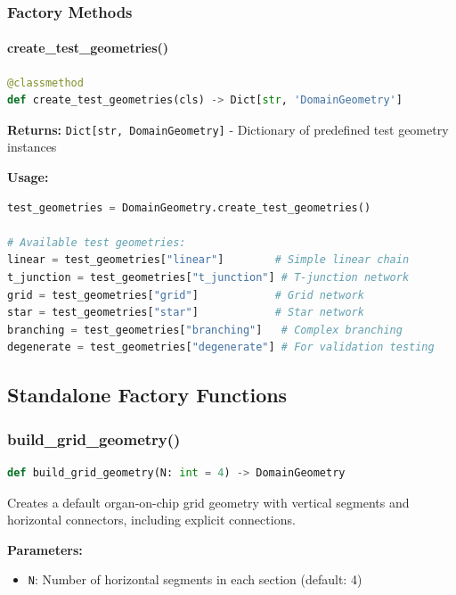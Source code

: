 \subsubsection{Factory Methods}

\paragraph{create\_test\_geometries()}\leavevmode
\begin{lstlisting}[language=Python, caption=Create Test Geometries Class Method]
@classmethod
def create_test_geometries(cls) -> Dict[str, 'DomainGeometry']
\end{lstlisting}

\textbf{Returns:} \texttt{Dict[str, DomainGeometry]} - Dictionary of predefined test geometry instances

\textbf{Usage:}
\begin{lstlisting}[language=Python]
test_geometries = DomainGeometry.create_test_geometries()

# Available test geometries:
linear = test_geometries["linear"]        # Simple linear chain
t_junction = test_geometries["t_junction"] # T-junction network
grid = test_geometries["grid"]            # Grid network
star = test_geometries["star"]            # Star network
branching = test_geometries["branching"]   # Complex branching
degenerate = test_geometries["degenerate"] # For validation testing
\end{lstlisting}

\subsection{Standalone Factory Functions}

\subsubsection{build\_grid\_geometry()}

\begin{lstlisting}[language=Python, caption=Build Grid Geometry Function]
def build_grid_geometry(N: int = 4) -> DomainGeometry
\end{lstlisting}

Creates a default organ-on-chip grid geometry with vertical segments and horizontal connectors, including explicit connections.

\textbf{Parameters:}
\begin{itemize}
    \item \texttt{N}: Number of horizontal segments in each section (default: 4)
\end{itemize}

